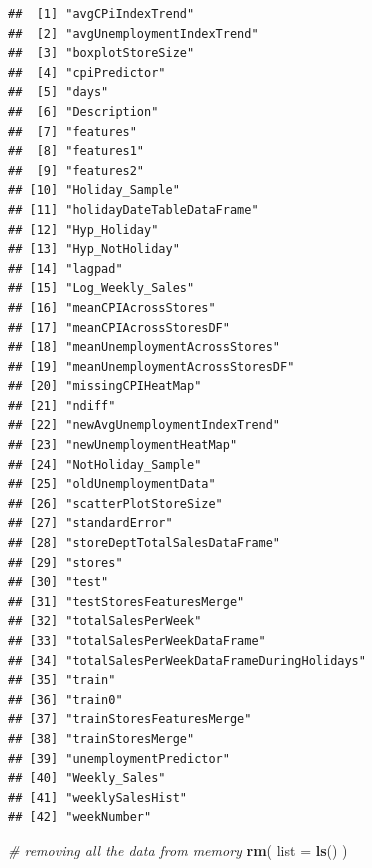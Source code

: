 \documentclass[]{article}
\newenvironment{Shaded}{\begin{snugshade}}{\end{snugshade}}
\newcommand{\KeywordTok}[1]{\textcolor[rgb]{0.13,0.29,0.53}{\textbf{{#1}}}}
\newcommand{\DataTypeTok}[1]{\textcolor[rgb]{0.13,0.29,0.53}{{#1}}}
\newcommand{\CommentTok}[1]{\textcolor[rgb]{0.56,0.35,0.01}{\textit{{#1}}}}
\newcommand{\NormalTok}[1]{{#1}}
\begin{document}
\begin{verbatim}
##  [1] "avgCPiIndexTrend"                        
##  [2] "avgUnemploymentIndexTrend"               
##  [3] "boxplotStoreSize"                        
##  [4] "cpiPredictor"                            
##  [5] "days"                                    
##  [6] "Description"                             
##  [7] "features"                                
##  [8] "features1"                               
##  [9] "features2"                               
## [10] "Holiday_Sample"                          
## [11] "holidayDateTableDataFrame"               
## [12] "Hyp_Holiday"                             
## [13] "Hyp_NotHoliday"                          
## [14] "lagpad"                                  
## [15] "Log_Weekly_Sales"                        
## [16] "meanCPIAcrossStores"                     
## [17] "meanCPIAcrossStoresDF"                   
## [18] "meanUnemploymentAcrossStores"            
## [19] "meanUnemploymentAcrossStoresDF"          
## [20] "missingCPIHeatMap"                       
## [21] "ndiff"                                   
## [22] "newAvgUnemploymentIndexTrend"            
## [23] "newUnemploymentHeatMap"                  
## [24] "NotHoliday_Sample"                       
## [25] "oldUnemploymentData"                     
## [26] "scatterPlotStoreSize"                    
## [27] "standardError"                           
## [28] "storeDeptTotalSalesDataFrame"            
## [29] "stores"                                  
## [30] "test"                                    
## [31] "testStoresFeaturesMerge"                 
## [32] "totalSalesPerWeek"                       
## [33] "totalSalesPerWeekDataFrame"              
## [34] "totalSalesPerWeekDataFrameDuringHolidays"
## [35] "train"                                   
## [36] "train0"                                  
## [37] "trainStoresFeaturesMerge"                
## [38] "trainStoresMerge"                        
## [39] "unemploymentPredictor"                   
## [40] "Weekly_Sales"                            
## [41] "weeklySalesHist"                         
## [42] "weekNumber"
\end{verbatim}

\begin{Shaded}
\begin{Highlighting}[]
\CommentTok{# removing all the data from memory}
\KeywordTok{rm}\NormalTok{( }\DataTypeTok{list =} \KeywordTok{ls}\NormalTok{() )}
\end{Highlighting}
\end{Shaded}
\end{document}
